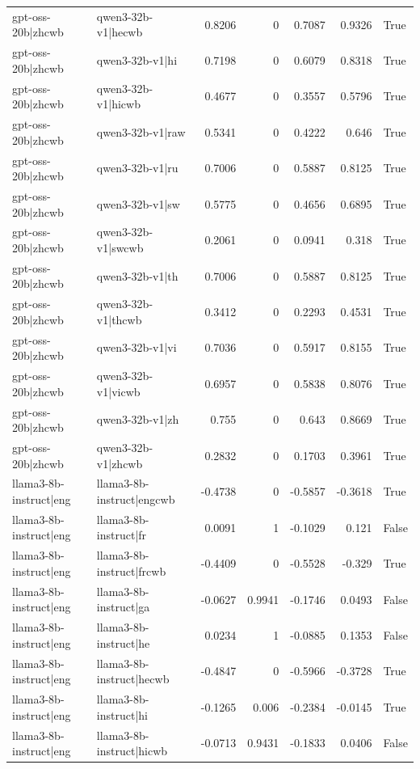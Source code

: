 \begin{table}
\begin{tabular}{l l r r r r l}
gpt-oss-20b|zhcwb & qwen3-32b-v1|hecwb & 0.8206 & 0 & 0.7087 & 0.9326 & True \\
gpt-oss-20b|zhcwb & qwen3-32b-v1|hi & 0.7198 & 0 & 0.6079 & 0.8318 & True \\
gpt-oss-20b|zhcwb & qwen3-32b-v1|hicwb & 0.4677 & 0 & 0.3557 & 0.5796 & True \\
gpt-oss-20b|zhcwb & qwen3-32b-v1|raw & 0.5341 & 0 & 0.4222 & 0.646 & True \\
gpt-oss-20b|zhcwb & qwen3-32b-v1|ru & 0.7006 & 0 & 0.5887 & 0.8125 & True \\
gpt-oss-20b|zhcwb & qwen3-32b-v1|sw & 0.5775 & 0 & 0.4656 & 0.6895 & True \\
gpt-oss-20b|zhcwb & qwen3-32b-v1|swcwb & 0.2061 & 0 & 0.0941 & 0.318 & True \\
gpt-oss-20b|zhcwb & qwen3-32b-v1|th & 0.7006 & 0 & 0.5887 & 0.8125 & True \\
gpt-oss-20b|zhcwb & qwen3-32b-v1|thcwb & 0.3412 & 0 & 0.2293 & 0.4531 & True \\
gpt-oss-20b|zhcwb & qwen3-32b-v1|vi & 0.7036 & 0 & 0.5917 & 0.8155 & True \\
gpt-oss-20b|zhcwb & qwen3-32b-v1|vicwb & 0.6957 & 0 & 0.5838 & 0.8076 & True \\
gpt-oss-20b|zhcwb & qwen3-32b-v1|zh & 0.755 & 0 & 0.643 & 0.8669 & True \\
gpt-oss-20b|zhcwb & qwen3-32b-v1|zhcwb & 0.2832 & 0 & 0.1703 & 0.3961 & True \\
llama3-8b-instruct|eng & llama3-8b-instruct|engcwb & -0.4738 & 0 & -0.5857 & -0.3618 & True \\
llama3-8b-instruct|eng & llama3-8b-instruct|fr & 0.0091 & 1 & -0.1029 & 0.121 & False \\
llama3-8b-instruct|eng & llama3-8b-instruct|frcwb & -0.4409 & 0 & -0.5528 & -0.329 & True \\
llama3-8b-instruct|eng & llama3-8b-instruct|ga & -0.0627 & 0.9941 & -0.1746 & 0.0493 & False \\
llama3-8b-instruct|eng & llama3-8b-instruct|he & 0.0234 & 1 & -0.0885 & 0.1353 & False \\
llama3-8b-instruct|eng & llama3-8b-instruct|hecwb & -0.4847 & 0 & -0.5966 & -0.3728 & True \\
llama3-8b-instruct|eng & llama3-8b-instruct|hi & -0.1265 & 0.006 & -0.2384 & -0.0145 & True \\
llama3-8b-instruct|eng & llama3-8b-instruct|hicwb & -0.0713 & 0.9431 & -0.1833 & 0.0406 & False \\

\end{tabular}
\end{table}
